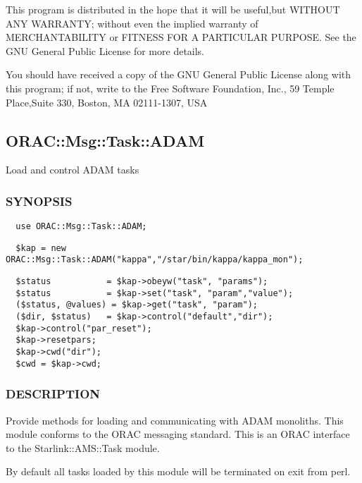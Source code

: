 This program is distributed in the hope that it will be useful,but WITHOUT ANY
WARRANTY; without even the implied warranty of MERCHANTABILITY or FITNESS FOR A
PARTICULAR PURPOSE. See the GNU General Public License for more details.



You should have received a copy of the GNU General Public License along with
this program; if not, write to the Free Software Foundation, Inc., 59 Temple
Place,Suite 330, Boston, MA  02111-1307, USA

\subsection{ORAC::Msg::Task::ADAM\label{ORAC::Msg::Task::ADAM}}


Load and control ADAM tasks

\subsubsection*{SYNOPSIS\label{ORAC::Msg::Task::ADAM_SYNOPSIS}}
\begin{verbatim}
  use ORAC::Msg::Task::ADAM;
\end{verbatim}
\begin{verbatim}
  $kap = new ORAC::Msg::Task::ADAM("kappa","/star/bin/kappa/kappa_mon");
\end{verbatim}
\begin{verbatim}
  $status           = $kap->obeyw("task", "params");
  $status           = $kap->set("task", "param","value");
  ($status, @values) = $kap->get("task", "param");
  ($dir, $status)   = $kap->control("default","dir");
  $kap->control("par_reset");
  $kap->resetpars;
  $kap->cwd("dir");
  $cwd = $kap->cwd;
\end{verbatim}
\subsubsection*{DESCRIPTION\label{ORAC::Msg::Task::ADAM_DESCRIPTION}}


Provide methods for loading and communicating with ADAM monoliths.
This module conforms to the ORAC messaging standard. This is an
ORAC interface to the Starlink::AMS::Task module.



By default all tasks loaded by this module will be terminated
on exit from perl.

